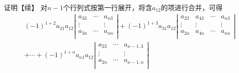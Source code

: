 \begin{frame}
  \begin{block}{证明【续】}
    对$n-1$个行列式按第一行展开，将含$a_{12}$的项进行合并，可得
    $$
    \begin{array}{ll}
      & (-1)^{1+2}a_{21} a_{12}
      \left|
      \begin{array}{ccc}       
        a_{33} & \cdots & a_{n3} \\
        \vdots  & & \vdots \\
        a_{3n} & \cdots & a_{nn} \\
      \end{array}
      \right| 
      + (-1)^{1+3}a_{31} a_{12}
      \left|
      \begin{array}{cccc}
        a_{23}  & a_{43} & \cdots & a_{n3} \\
        \vdots & \vdots & & \vdots \\
        a_{2n}  & a_{4n} & \cdots & a_{nn} \\
      \end{array}
      \right|  \\[0.4in]
      & + \cdots +(-1)^{1+n} a_{n1} a_{12}
      \left|
      \begin{array}{ccc}
        a_{23} & \cdots & a_{n-1,3} \\
        \vdots & & \vdots \\
        a_{2n} & \cdots & a_{n-1,n} \\
      \end{array}
      \right|
    \end{array}
    $$
  \end{block}
\end{frame}


